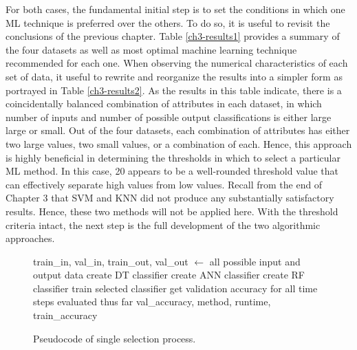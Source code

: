 \documentclass[12pt]{uthesis-v12}  %
\begin{document}
For both cases, the fundamental initial step is to set the conditions in which one ML technique is preferred over the others. To do so, it is useful to revisit the conclusions of the previous chapter. Table \ref{ch3-results1} provides a summary of the four datasets as well as most optimal machine learning technique recommended for each one. When observing the numerical characteristics of each set of data, it useful to rewrite and reorganize the results into a simpler form as portrayed in Table \ref{ch3-results2}. As the results in this table indicate, there is a coincidentally balanced combination of attributes in each dataset, in which number of inputs and number of possible output classifications is either large large or small. Out of the four datasets, each combination of attributes has either two large values, two small values, or a combination of each. Hence, this approach is highly beneficial in determining the thresholds in which to select a particular ML method. In this case, 20 appears to be a well-rounded threshold value that can effectively separate high values from low values.
Recall from the end of Chapter 3 that SVM and KNN did not produce any substantially satisfactory results. Hence, these two methods will not be applied here. With the threshold criteria intact, the next step is the full development of the two algorithmic approaches.

\begin{figure}
\begin{algorithmic}[1]
\STATE train\_in, val\_in, train\_out, val\_out $\leftarrow$ all possible input and output data	
	\STATE create DT classifier
\ELSE
		\STATE create ANN classifier
	\ELSE
		\STATE create RF classifier
	\ENDIF
\ENDIF		
\STATE train selected classifier
	\STATE get validation accuracy for all time steps evaluated thus far
\ENDFOR
\RETURN val\_accuracy, method, runtime, train\_accuracy
\label{full-alg-dagsi2-1}
\end{algorithmic}
\caption{Pseudocode of single selection process.} 
\label{full-alg-dagsi2-1}
\end{figure}	
\end{document}
